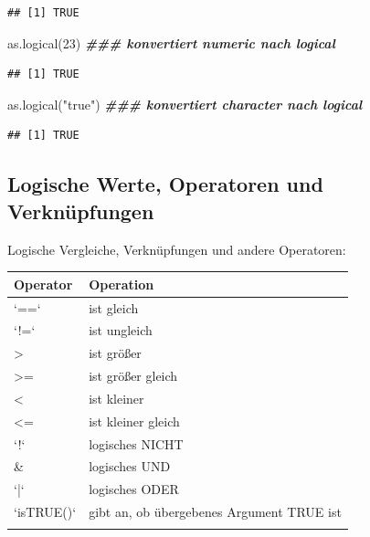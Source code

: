 \documentclass[
]{book}
\newenvironment{Shaded}{\begin{snugshade}}{\end{snugshade}}
\newcommand{\DecValTok}[1]{\textcolor[rgb]{0.00,0.00,0.81}{#1}}
\newcommand{\DocumentationTok}[1]{\textcolor[rgb]{0.56,0.35,0.01}{\textbf{\textit{#1}}}}
\newcommand{\FunctionTok}[1]{\textcolor[rgb]{0.00,0.00,0.00}{#1}}
\newcommand{\NormalTok}[1]{#1}
\newcommand{\StringTok}[1]{\textcolor[rgb]{0.31,0.60,0.02}{#1}}
\begin{document}
\begin{verbatim}
## [1] TRUE
\end{verbatim}

\begin{Shaded}
\begin{Highlighting}[]
\FunctionTok{as.logical}\NormalTok{(}\DecValTok{23}\NormalTok{)  }\DocumentationTok{\#\#\# konvertiert numeric nach logical}
\end{Highlighting}
\end{Shaded}

\begin{verbatim}
## [1] TRUE
\end{verbatim}

\begin{Shaded}
\begin{Highlighting}[]
\FunctionTok{as.logical}\NormalTok{(}\StringTok{"true"}\NormalTok{)  }\DocumentationTok{\#\#\# konvertiert character nach logical}
\end{Highlighting}
\end{Shaded}

\begin{verbatim}
## [1] TRUE
\end{verbatim}

\hypertarget{logische-werte-operatoren-und-verknuxfcpfungen}{%
\subsection*{Logische Werte, Operatoren und Verknüpfungen}\label{logische-werte-operatoren-und-verknuxfcpfungen}}

Logische Vergleiche, Verknüpfungen und andere Operatoren:

\begin{table}
\centering\begingroup\fontsize{15}{17}\selectfont

\begin{tabular}[t]{l|l}
\hline
Operator & Operation\\
\hline
`==` & ist gleich\\
\hline
`!=` & ist ungleich\\
\hline
> & ist größer\\
\hline
>= & ist größer gleich\\
\hline
< & ist kleiner\\
\hline
<= & ist kleiner gleich\\
\hline
`!` & logisches NICHT\\
\hline
\& & logisches UND\\
\hline
`|` & logisches ODER\\
\hline
`isTRUE()` & gibt an, ob übergebenes Argument TRUE ist\\
\hline
 & \\
\hline
\end{tabular}
\endgroup{}
\end{table}
\end{document}
